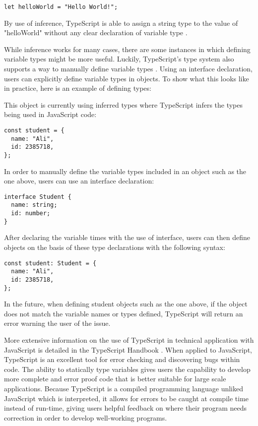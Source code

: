 \documentclass{article}
\theoremstyle{theorem}
\theoremstyle{definition}
\theoremstyle{remark}
\begin{document}
\begin{lstlisting}
let helloWorld = "Hello World!";
\end{lstlisting}

By use of inference, TypeScript is able to assign a string type to the value of "helloWorld" without any clear declaration of variable type \cite{16}.

While inference works for many cases, there are some instances in which defining variable types might be more useful. Luckily, TypeScript's type system also supports a way to manually define variable types \cite{16}. Using an interface declaration, users can explicitly define variable types in objects. To show what this looks like in practice, here is an example of defining types:


This object is currently using inferred types where TypeScript infers the types being used in JavaScript code:
\begin{lstlisting}
const student = {
  name: "Ali",
  id: 2385718,
};
\end{lstlisting}

In order to manually define the variable types included in an object such as the one above, users can use an interface declaration:

\begin{lstlisting}
interface Student {
  name: string;
  id: number;
}
\end{lstlisting}

After declaring the variable times with the use of interface, users can then define objects on the basis of these type declarations with the following syntax:

\begin{lstlisting}
const student: Student = {
  name: "Ali",
  id: 2385718,
};
\end{lstlisting}

In the future, when defining student objects such as the one above, if the object does not match the variable names or types defined, TypeScript will return an error warning the user of the issue.

More extensive information on the use of TypeScript in technical application with JavaScript is detailed in the TypeScript Handbook \cite{11}. When applied to JavaScript, TypeScript is an excellent tool for error checking and discovering bugs within code. The ability to statically type variables gives users the capability to develop more complete and error proof code that is better suitable for large scale applications. Because TypeScript is a compiled programming language unliked JavaScript which is interpreted, it allows for errors to be caught at compile time instead of run-time, giving users helpful feedback on where their program needs correction in order to develop well-working programs.
\end{document}
